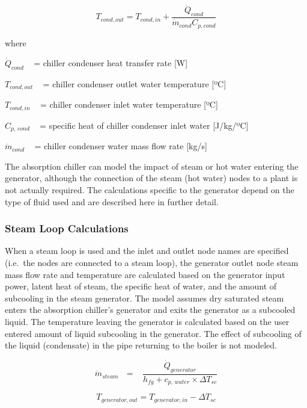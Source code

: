 \begin{equation}
  T_{cond,out} = T_{cond,in} + \frac{\dot{Q}_{cond}}{\dot{m}_{cond}C_{p,cond}}
\end{equation}

where

\({\dot Q_{cond}}\) ~ = chiller condenser heat transfer rate {[}W{]}

\({T_{cond,out}}\) ~ = chiller condenser outlet water temperature {[}ºC{]}

\({T_{cond,in}}\) ~ = chiller condenser inlet water temperature {[}ºC{]}

\({C_{p,\,cond}}\) ~ = specific heat of chiller condenser inlet water {[}J/kg/ºC{]}

\({\dot m_{cond}}\) ~ = chiller condenser water mass flow rate {[}kg/s{]}

The absorption chiller can model the impact of steam or hot water entering the generator, although the connection of the steam (hot water) nodes to a plant is not actually required. The calculations specific to the generator depend on the type of fluid used and are described here in further detail.

\subsubsection{Steam Loop Calculations}\label{steam-loop-calculations}

When a steam loop is used and the inlet and outlet node names are specified (i.e.~the nodes are connected to a steam loop), the generator outlet node steam mass flow rate and temperature are calculated based on the generator input power, latent heat of steam, the specific heat of water, and the amount of subcooling in the steam generator. The model assumes dry saturated steam enters the absorption chiller's generator and exits the generator as a subcooled liquid. The temperature leaving the generator is calculated based on the user entered amount of liquid subcooling in the generator. The effect of subcooling of the liquid (condensate) in the pipe returning to the boiler is not modeled.

\begin{equation}
{\dot m_{steam}}\,\,\,\, = \,\,\,\,\,\frac{{{{\dot Q}_{generator}}}}{{{h_{fg}} + {c_{p,\,water}} \times \Delta {T_{sc}}}}
\end{equation}

\begin{equation}
{T_{generator,out}} = {T_{generator,in}} - \Delta {T_{sc}}
\end{equation}

